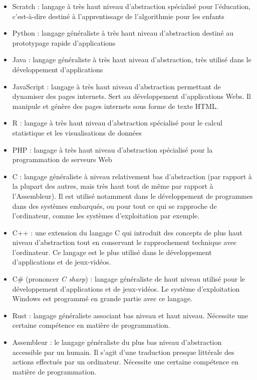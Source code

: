 \documentclass[../../main.tex]{subfiles}
\begin{document}
\begin{itemize}
	\item Scratch : langage à très haut niveau d'abstraction spécialisé pour l'éducation, c'est-à-dire destiné à l'apprentissage de l'algorithmie pour les enfants
	\item Python : langage généraliste à très haut niveau d'abstraction destiné au prototypage rapide d'applications
	\item Java : langage généraliste à très haut niveau d'abstraction, très utilisé dans le développement d'applications
	\item JavaScript : langage à très haut niveau d'abstraction permettant de dynamiser des pages internets. Sert au développement d'applications Webs. Il manipule et génère des pages internets sous forme de texte HTML.
	\item R : langage à très haut niveau d'abstraction spécialisé pour le calcul statistique et les visualisations de données
	\item PHP : langage à très haut niveau d'abstraction spécialisé pour la programmation de serveurs Web
	\item C : langage généraliste à niveau relativement bas d'abstraction (par rapport à la plupart des autres, mais très haut tout de même par rapport à l'Assembleur). Il est utilisé notamment dans le développement de programmes dans des systèmes embarqués, ou pour tout ce qui se rapproche de l'ordinateur, comme les systèmes d'exploitation par exemple.
	\item C++ : une extension du langage C qui introduit des concepts de plus haut niveau d'abstraction tout en conservant le rapprochement technique avec l'ordinateur. Ce langage est le plus utilisé dans le développement d'applications et de jeux-vidéos.
	\item C\# (prononcer \textit{C sharp}) : langage généraliste de haut niveau utilisé pour le développement d'applications et de jeux-vidéos. Le système d'exploitation Windows est programmé en grande partie avec ce langage. 
	\item Rust : langage généraliste associant bas niveau et haut niveau. Nécessite une certaine compétence en matière de programmation.
	\item Assembleur : le langage généraliste du plus bas niveau d'abstraction accessible par un humain. Il s'agit d'une traduction presque littérale des actions effectués par un ordinateur. Nécessite une certaine compétence en matière de programmation.
\end{itemize}
\end{document}
